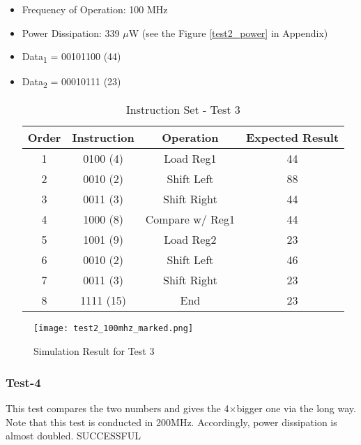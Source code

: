 \documentclass[12pt]{article}
\begin{document}
\begin{itemize}
\item Frequency of Operation: 100 MHz
\item Power Dissipation: 339 $\mu$W (see the Figure \ref{test2_power} in Appendix)
\item Data\textsubscript{1} = 00101100 (44) 
\item Data\textsubscript{2} = 00010111 (23) 
\begin{table}[h]
\centering
\begin{tabular}{|c|c|c|c|}
\hline 
Order & Instruction & Operation & Expected Result \\ 
\hline 
1 & 0100 (4) & Load Reg1 & 44 \\ 
\hline 
2 & 0010 (2) & Shift Left & 88 \\ 
\hline 
3 & 0011 (3) & Shift Right & 44 \\ 
\hline 
4 & 1000 (8) & Compare w/ Reg1 & 44 \\ 
\hline 
5 & 1001 (9) & Load Reg2 & 23 \\ 
\hline 
6 & 0010 (2) & Shift Left & 46 \\ 
\hline 
7 & 0011 (3) & Shift Right & 23 \\ 
\hline 
8 & 1111 (15) & End & 23 \\ 
\hline 
\end{tabular} 
\caption{Instruction Set - Test 3}
\end{table}
\end{itemize}


\begin{figure}[H]
\centering
\texttt{[image: test2\_100mhz\_marked.png]}
\caption{Simulation Result for Test 3}
\label{test3}
\end{figure}




\subsubsection*{Test-4} %
This test compares the two numbers and gives the 4$\times$bigger one via the long way. Note that this test is conducted in 200MHz. Accordingly, power dissipation is almost doubled.  \color{Green} SUCCESSFUL \color{Black}
\end{document}
